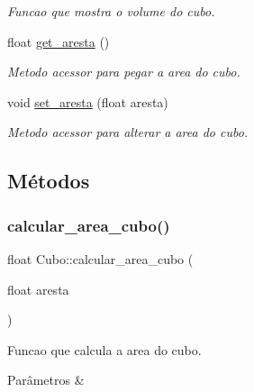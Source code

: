 \begin{DoxyCompactItemize}
\begin{DoxyCompactList}\small\item\em Funcao que mostra o volume do cubo. \end{DoxyCompactList}\item 
float \hyperlink{classCubo_ad11623c0a6fe0d80f6c68bc38ad50095}{get\+\_\+aresta} ()
\begin{DoxyCompactList}\small\item\em Metodo acessor para pegar a area do cubo. \end{DoxyCompactList}\item 
void \hyperlink{classCubo_ac23d98431874ff9f942e12abd7725141}{set\+\_\+aresta} (float aresta)
\begin{DoxyCompactList}\small\item\em Metodo acessor para alterar a area do cubo. \end{DoxyCompactList}\end{DoxyCompactItemize}


\subsection{Métodos}
\mbox{\label{classCubo_a04d86d86766dd5c61b52ab23c46a18c4}} 
\subsubsection{\texorpdfstring{calcular\+\_\+area\+\_\+cubo()}{calcular\_area\_cubo()}}
{\footnotesize\ttfamily float Cubo\+::calcular\+\_\+area\+\_\+cubo (\begin{DoxyParamCaption}\item[{float}]{aresta }\end{DoxyParamCaption})}



Funcao que calcula a area do cubo. 


\begin{DoxyParams}{Parâmetros}
{\em } & \\
\hline
\end{DoxyParams}
\mbox{\label{classCubo_a7e0a0c1a63424349413783489e7be646}} 

